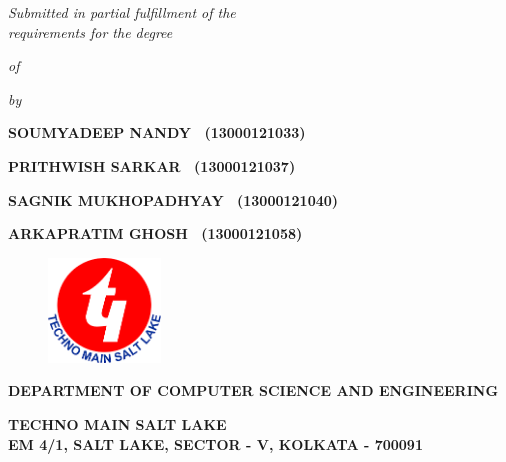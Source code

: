 \thispagestyle{empty}
\begin{center}
    {\Large \bfseries 
  \begin{spacing}{1} %
    \mytitle
  \end{spacing}
    \par}
\vspace{2\baselineskip}
    {
    {\large \textit{Submitted in partial fulfillment of the}}\\
    {\large \textit{requirements for the degree}}
    }\par
\vspace{\baselineskip}
    {{\large \textit{of}} \par}
\vspace{\baselineskip}
    {\Large \bf \mydegree \par} 
\vspace{\baselineskip}
{{\large \textit{by}} \par}
\vspace{\baselineskip}
    {{\Large {\bf SOUMYADEEP NANDY ~(13000121033)}} \par}
    {{\Large {\bf PRITHWISH SARKAR ~(13000121037)}} \par}
    {{\Large {\bf SAGNIK MUKHOPADHYAY ~(13000121040)}} \par}
    {{\Large {\bf ARKAPRATIM GHOSH ~(13000121058)}} \par}
\vspace{2\baselineskip}
    {\begin{figure}[!h] 
	\centering
	\includegraphics[width=30mm]{./Images/tmsl.png} 
     \end{figure}
    }
\vspace{2\baselineskip}
    {\large \bf \MakeUppercase{Department of Computer Science and Engineering} \par}
\vspace*{1ex}
    {\large \bf \uppercase{Techno Main Salt Lake\\
                    EM 4/1, Salt lake, Sector - V, Kolkata - 700091} \par}
 \end{center}
